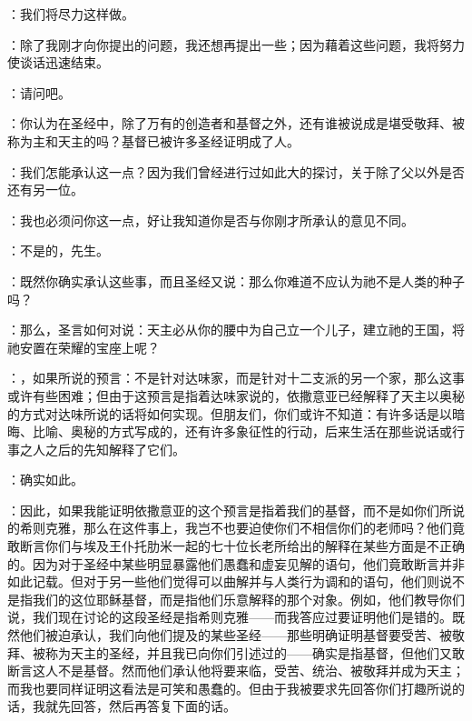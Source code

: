 ：我们将尽力这样做。\par

：除了我刚才向你提出的问题，我还想再提出一些；因为藉着这些问题，我将努力使谈话迅速结束。\par

：请问吧。\par

：你认为在圣经中，除了万有的创造者和基督之外，还有谁被说成是堪受敬拜、被称为主和天主的吗？基督已被许多圣经证明成了人。\par

：我们怎能承认这一点？因为我们曾经进行过如此大的探讨，关于除了父以外是否还有另一位。\par

：我也必须问你这一点，好让我知道你是否与你刚才所承认的意见不同。\par

：不是的，先生。\par

：既然你确实承认这些事，而且圣经又说：那么你难道不应认为祂不是人类的种子吗？\par

：那么，圣言如何对说：天主必从你的腰中为自己立一个儿子，建立祂的王国，将祂安置在荣耀的宝座上呢？\par

：，如果所说的预言：不是针对达味家，而是针对十二支派的另一个家，那么这事或许有些困难；但由于这预言是指着达味家说的，依撒意亚已经解释了天主以奥秘的方式对达味所说的话将如何实现。但朋友们，你们或许不知道：有许多话是以暗晦、比喻、奥秘的方式写成的，还有许多象征性的行动，后来生活在那些说话或行事之人之后的先知解释了它们。\par

：确实如此。\par

：因此，如果我能证明依撒意亚的这个预言是指着我们的基督，而不是如你们所说的希则克雅，那么在这件事上，我岂不也要迫使你们不相信你们的老师吗？他们竟敢断言你们与埃及王仆托肋米一起的七十位长老所给出的解释在某些方面是不正确的。因为对于圣经中某些明显暴露他们愚蠢和虚妄见解的语句，他们竟敢断言并非如此记载。但对于另一些他们觉得可以曲解并与人类行为调和的语句，他们则说不是指我们的这位耶稣基督，而是指他们乐意解释的那个对象。例如，他们教导你们说，我们现在讨论的这段圣经是指希则克雅——而我答应过要证明他们是错的。既然他们被迫承认，我们向他们提及的某些圣经——那些明确证明基督要受苦、被敬拜、被称为天主的圣经，并且我已向你们引述过的——确实是指基督，但他们又敢断言这人不是基督。然而他们承认他将要来临，受苦、统治、被敬拜并成为天主；而我也要同样证明这看法是可笑和愚蠢的。但由于我被要求先回答你们打趣所说的话，我就先回答，然后再答复下面的话。\par

